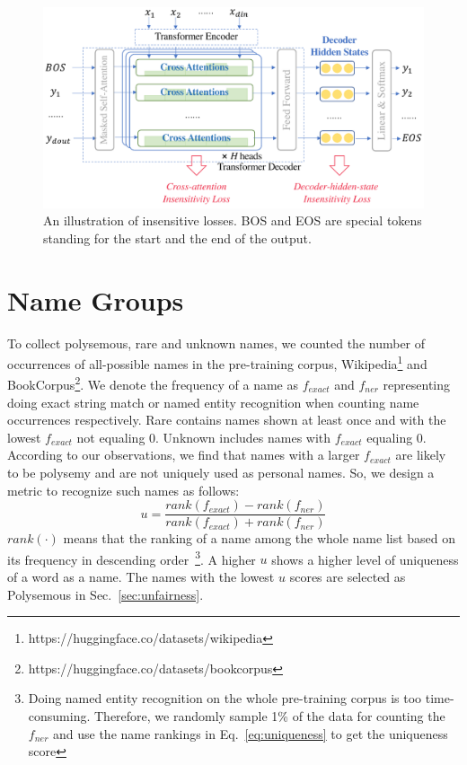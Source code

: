 \begin{figure}[]
	\centering
	\includegraphics[scale=0.6]{model.pdf}
	\caption{An illustration of insensitive losses. BOS and EOS are special tokens standing for the start and the end of the output.} %
	\label{fig:model}
\end{figure}

\section{Name Groups}
\label{sec:app-names}
To collect polysemous, rare and unknown names, we counted the number of occurrences of all-possible names in the pre-training corpus, Wikipedia\footnote{{https://huggingface.co/datasets/wikipedia}} and BookCorpus\footnote{https://huggingface.co/datasets/bookcorpus}. We denote the frequency of a name as $f_{exact}$ and $f_{ner}$ representing doing exact string match or named entity recognition when counting name occurrences respectively. Rare contains names shown at least once and with the lowest $f_{exact}$ not equaling 0. Unknown includes names with $f_{exact}$ equaling 0. According to our observations, we find that names with a larger $f_{exact}$ are likely to be polysemy and are not uniquely used as personal names. 
So, we design a metric to recognize such names as follows:
\begin{equation}
	u = \frac{rank(f_{exact})-rank(f_{ner})}{rank(f_{exact})+rank(f_{ner})}
	\label{eq:uniqueness}
\end{equation}
$rank(\cdot)$ means that the ranking of a name among the whole name list based on its frequency in descending order~\footnote{Doing named entity recognition on the whole pre-training corpus is too time-consuming. Therefore, we randomly sample 1\% of the data for counting the $f_{ner}$ and use the name rankings in Eq.~\ref{eq:uniqueness} to get the uniqueness score}. A higher $u$ shows a higher level of uniqueness of a word as a name. The names with the lowest $u$ scores are selected as Polysemous in Sec.~\ref{sec:unfairness}.

